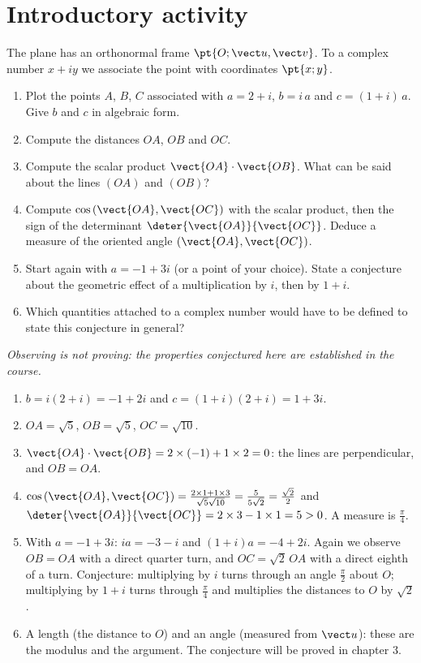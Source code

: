 \mxnewpage
\section{Introductory activity}
\begin{activity}
The plane has an orthonormal frame $\pt{O;\vect u,\vect v}$. To a complex number $x+iy$ we associate the point with coordinates $\pt{x;y}$.
\begin{enumerate}
\item Plot the points $A$, $B$, $C$ associated with $a=2+i$, $b=i\,a$ and $c=(1+i)\,a$. Give $b$ and $c$ in algebraic form.
\item Compute the distances $OA$, $OB$ and $OC$.
\item Compute the scalar product $\vect{OA}\cdot\vect{OB}$. What can be said about the lines $(OA)$ and $(OB)$?
\item Compute $\cos\left(\vect{OA},\vect{OC}\right)$ with the scalar product, then the sign of the determinant $\deter{\vect{OA}}{\vect{OC}}$. Deduce a measure of the oriented angle $\left(\vect{OA},\vect{OC}\right)$.
\item Start again with $a=-1+3i$ (or a point of your choice). State a conjecture about the geometric effect of a multiplication by $i$, then by $1+i$.
\item Which quantities attached to a complex number would have to be defined to state this conjecture in general?
\end{enumerate}
\par\emph{Observing is not proving: the properties conjectured here are established in the course.}
\end{activity}
\begin{solution}[Activity]
\begin{enumerate}
\item $b=i(2+i)=-1+2i$ and $c=(1+i)(2+i)=1+3i$.
\item $OA=\sqrt5$, $OB=\sqrt5$, $OC=\sqrt{10}$.
\item $\vect{OA}\cdot\vect{OB}=2\times(-1)+1\times2=0$: the lines are perpendicular, and $OB=OA$.
\item $\cos\left(\vect{OA},\vect{OC}\right)=\frac{2\times1+1\times3}{\sqrt5\sqrt{10}}=\frac{5}{5\sqrt2}=\frac{\sqrt2}2$ and $\deter{\vect{OA}}{\vect{OC}}=2\times3-1\times1=5>0$. A measure is $\frac\pi4$.
\item With $a=-1+3i$: $ia=-3-i$ and $(1+i)a=-4+2i$. Again we observe $OB=OA$ with a direct quarter turn, and $OC=\sqrt2\,OA$ with a direct eighth of a turn. Conjecture: multiplying by $i$ turns through an angle $\frac\pi2$ about $O$; multiplying by $1+i$ turns through $\frac\pi4$ and multiplies the distances to $O$ by $\sqrt2$.
\item A length (the distance to $O$) and an angle (measured from $\vect u$): these are the modulus and the argument. The conjecture will be proved in chapter 3.
\end{enumerate}
\end{solution}
